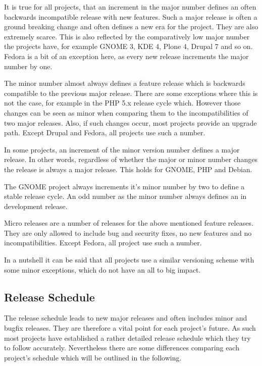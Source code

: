 It is true for all projects, that an increment in the major number defines an
often backwards incompatible release with new features. Such a major release is
often a ground breaking change and often defines a new era for the project.
They are also extremely scarce. This is also reflected by the comparatively low
major number the projects have, for example GNOME 3, KDE 4, Plone 4, Drupal 7
and so on. Fedora is a bit of an exception here, as every new release
increments the major number by one.

The minor number almost always defines a feature release which is backwards
compatible to the previous major release. There are some exceptions where this
is not the case, for example in the PHP 5.x release cycle which. However those
changes can be seen as minor when comparing them to the incompatibilities of
two major releases. Also, if such changes occur, most projects provide an
upgrade path. Except Drupal and Fedora, all projects use such a number.

In some projects, an increment of the minor version number defines a major
release. In other words, regardless of whether the major or minor number
changes the release is always a major release. This holds for GNOME, PHP and
Debian.

The GNOME project always increments it's minor number by two to define a stable
release cycle. An odd number as the minor number always defines an in
development release.

Micro releases are a number of releases for the above mentioned feature
releases. They are only allowed to include bug and security fixes, no new
features and no incompatibilities. Except Fedora, all project use such a
number.

In a nutshell it can be said that all projects use a similar versioning scheme
with some minor exceptions, which do not have an all to big impact.


\subsection{Release Schedule} %
\label{sub:Release Schedule}

The release schedule leads to new major releases and often includes minor and
bugfix releases. They are therefore a vital point for each project's future. As
such most projects have established a rather detailed release schedule which
they try to follow accurately. Nevertheless there are some differences
comparing each project's schedule which will be outlined in the following.

